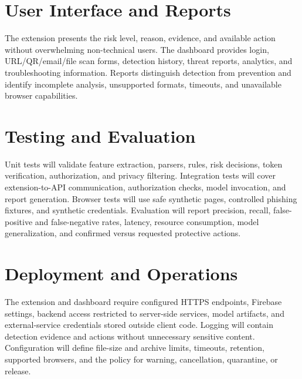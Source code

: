 \section{User Interface and Reports}
The extension presents the risk level, reason, evidence, and available action without
overwhelming non-technical users. The dashboard provides login, URL/QR/email/file scan
forms, detection history, threat reports, analytics, and troubleshooting information.
Reports distinguish detection from prevention and identify incomplete analysis,
unsupported formats, timeouts, and unavailable browser capabilities.

\section{Testing and Evaluation}
Unit tests will validate feature extraction, parsers, rules, risk decisions, token
verification, authorization, and privacy filtering. Integration tests will cover
extension-to-API communication, authorization checks, model invocation, and
report generation. Browser tests will use safe synthetic pages, controlled phishing
fixtures, and synthetic credentials. Evaluation will report precision, recall,
false-positive and false-negative rates, latency, resource consumption, model
generalization, and confirmed versus requested protective actions.

\section{Deployment and Operations}
The extension and dashboard require configured HTTPS endpoints, Firebase settings,
backend access restricted to server-side services, model artifacts, and external-service
credentials stored outside client code. Logging will contain detection evidence and
actions without unnecessary sensitive content. Configuration will define file-size and
archive limits, timeouts, retention, supported browsers, and the policy for warning,
cancellation, quarantine, or release.
